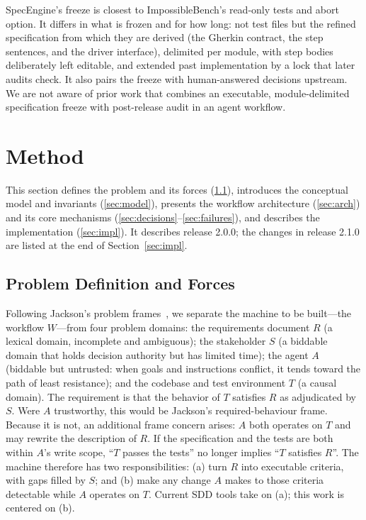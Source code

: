 \documentclass[conference]{IEEEtran}
\begin{document}
SpecEngine's freeze is closest to ImpossibleBench's read-only tests and abort option. It differs in what is frozen and for how long: not test files but the refined specification from which they are derived (the Gherkin contract, the step sentences, and the driver interface), delimited per module, with step bodies deliberately left editable, and extended past implementation by a lock that later audits check. It also pairs the freeze with human-answered decisions upstream. We are not aware of prior work that combines an executable, module-delimited specification freeze with post-release audit in an agent workflow.

\section{Method}\label{sec:method}

This section defines the problem and its forces (\ref{sec:problem}), introduces the conceptual model and invariants (\ref{sec:model}), presents the workflow architecture (\ref{sec:arch}) and its core mechanisms (\ref{sec:decisions}--\ref{sec:failures}), and describes the implementation (\ref{sec:impl}). It describes release 2.0.0; the changes in release 2.1.0 are listed at the end of Section~\ref{sec:impl}.

\subsection{Problem Definition and Forces}\label{sec:problem}

Following Jackson's problem frames~\cite{jackson2001problem}, we separate the machine to be built---the workflow $W$---from four problem domains: the requirements document $R$ (a lexical domain, incomplete and ambiguous); the stakeholder $S$ (a biddable domain that holds decision authority but has limited time); the agent $A$ (biddable but untrusted: when goals and instructions conflict, it tends toward the path of least resistance); and the codebase and test environment $T$ (a causal domain). The requirement is that the behavior of $T$ satisfies $R$ as adjudicated by $S$. Were $A$ trustworthy, this would be Jackson's required-behaviour frame. Because it is not, an additional frame concern arises: $A$ both operates on $T$ and may rewrite the description of $R$. If the specification and the tests are both within $A$'s write scope, ``$T$ passes the tests'' no longer implies ``$T$ satisfies $R$''. The machine therefore has two responsibilities: (a) turn $R$ into executable criteria, with gaps filled by $S$; and (b) make any change $A$ makes to those criteria detectable while $A$ operates on $T$. Current SDD tools take on (a); this work is centered on (b).
\end{document}
